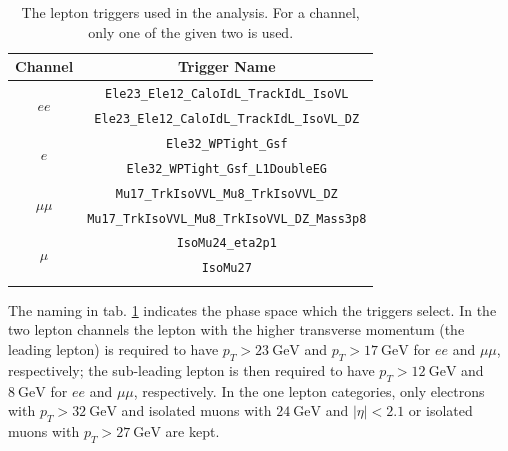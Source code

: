 \begin{table}[h!]
	\centering
	\begin{tabular}{cc}
		Channel & Trigger Name \\
		\hline 
		\multirow{2}{*}{$ee$} & \texttt{Ele23\_Ele12\_CaloIdL\_TrackIdL\_IsoVL} \\
		& \texttt{Ele23\_Ele12\_CaloIdL\_TrackIdL\_IsoVL\_DZ} \\
		\hline 
		\multirow{2}{*}{$e$} & \texttt{Ele32\_WPTight\_Gsf} \\
		& \texttt{Ele32\_WPTight\_Gsf\_L1DoubleEG} \\
		\hline 
		\multirow{2}{*}{$\mu\mu$} & \texttt{Mu17\_TrkIsoVVL\_Mu8\_TrkIsoVVL\_DZ} \\
		& \texttt{Mu17\_TrkIsoVVL\_Mu8\_TrkIsoVVL\_DZ\_Mass3p8} \\
		\hline 
		\multirow{2}{*}{$\mu$} & \texttt{IsoMu24\_eta2p1} \\
		& \texttt{IsoMu27} \\
		\hline \\
	\end{tabular}
	\caption{The lepton triggers used in the analysis. For a channel, only one of the given two is used.}
	\label{tab:triggers}
\end{table}

The naming in tab. \ref{tab:triggers} indicates the phase space which the triggers select. In the two lepton channels the lepton with the higher transverse momentum (the leading lepton) is required to have $p_T > \SI{23}{\giga\electronvolt}$ and $p_T > \SI{17}{\giga\electronvolt}$ for $ee$ and $\mu\mu$, respectively; the sub-leading lepton is then required to have $p_T>\SI{12}{\giga\electronvolt}$ and $\SI{8}{\giga\electronvolt}$ for $ee$ and $\mu\mu$, respectively. In the one lepton categories, only electrons with $p_T>\SI{32}{\giga\electronvolt}$ and isolated muons with $\SI{24}{\giga\electronvolt}$ and $|\eta|<2.1$ or isolated muons with $p_T>\SI{27}{\giga\electronvolt}$ are kept.


